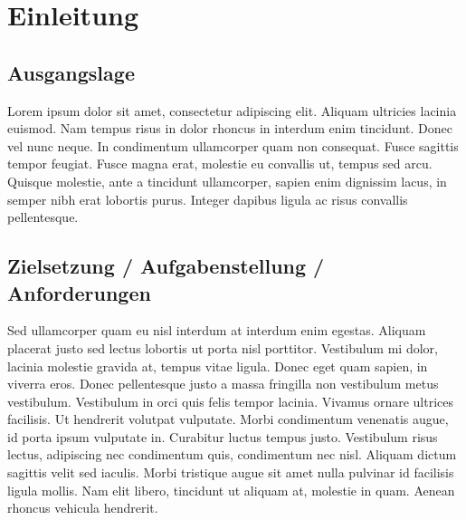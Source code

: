 


\chapter{Einleitung} %


\label{Chapter1} %


\section{Ausgangslage}

Lorem ipsum dolor sit amet, consectetur adipiscing elit. Aliquam ultricies lacinia euismod. Nam tempus risus in dolor rhoncus in interdum enim tincidunt. Donec vel nunc neque. In condimentum ullamcorper quam non consequat. Fusce sagittis tempor feugiat. Fusce magna erat, molestie eu convallis ut, tempus sed arcu. Quisque molestie, ante a tincidunt ullamcorper, sapien enim dignissim lacus, in semper nibh erat lobortis purus. Integer dapibus ligula ac risus convallis pellentesque.


\section{Zielsetzung / Aufgabenstellung / Anforderungen}

Sed ullamcorper quam eu nisl interdum at interdum enim egestas. Aliquam placerat justo sed lectus lobortis ut porta nisl porttitor. Vestibulum mi dolor, lacinia molestie gravida at, tempus vitae ligula. Donec eget quam sapien, in viverra eros. Donec pellentesque justo a massa fringilla non vestibulum metus vestibulum. Vestibulum in orci quis felis tempor lacinia. Vivamus ornare ultrices facilisis. Ut hendrerit volutpat vulputate. Morbi condimentum venenatis augue, id porta ipsum vulputate in. Curabitur luctus tempus justo. Vestibulum risus lectus, adipiscing nec condimentum quis, condimentum nec nisl. Aliquam dictum sagittis velit sed iaculis. Morbi tristique augue sit amet nulla pulvinar id facilisis ligula mollis. Nam elit libero, tincidunt ut aliquam at, molestie in quam. Aenean rhoncus vehicula hendrerit.



